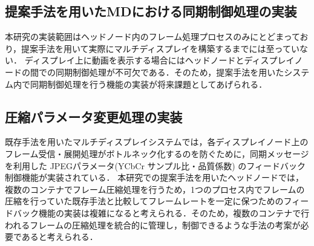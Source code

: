 \clearpage

\subsection*{提案手法を用いたMDにおける同期制御処理の実装}
本研究の実装範囲はヘッドノード内のフレーム処理プロセスのみにとどまっており，提案手法を用いて実際にマルチディスプレイを構築するまでには至っていない．
ディスプレイ上に動画を表示する場合にはヘッドノードとディスプレイノードの間での同期制御処理が不可欠である．そのため，提案手法を用いたシステム内で同期制御処理を行う機能の実装が将来課題としてあげられる．

\subsection*{圧縮パラメータ変更処理の実装}
既存手法を用いたマルチディスプレイシステムでは，各ディスプレイノード上のフレーム受信・展開処理がボトルネック化するのを防ぐために，同期メッセージを利用した
JPEGパラメータ(YCbCr サンプル比・品質係数) のフィードバック制御機能が実装されている．
本研究での提案手法を用いたヘッドノードでは，複数のコンテナでフレーム圧縮処理を行うため，1つのプロセス内でフレームの圧縮を行っていた既存手法と比較してフレームレートを一定に保つためのフィードバック機能の実装は複雑になると考えられる．そのため，複数のコンテナで行われるフレームの圧縮処理を統合的に管理し，制御できるような手法の考案が必要であると考えられる．